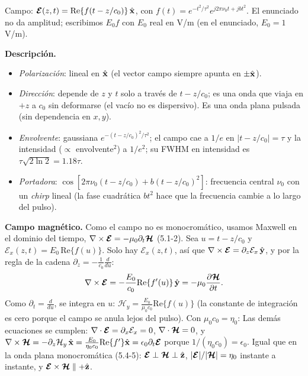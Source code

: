 Campo: $\boldsymbol{\mathcal E}(z,t)=\mathrm{Re}\{f(t-z/c_0)\}\,\hat{\mathbf x}$, con $f(t)=e^{-t^2/\tau^2}e^{j2\pi\nu_0t+jbt^2}$. El enunciado no da
amplitud; escribimos $E_0f$ con $E_0$ real en V/m (en el enunciado, $E_0=1$ V/m).

 \textbf{Descripción.}
\begin{itemize}
\item \emph{Polarización}: lineal en $\hat{\mathbf x}$ (el vector campo siempre apunta en $\pm\hat{\mathbf x}$).
\item \emph{Dirección}: depende de $z$ y $t$ solo a través de $t-z/c_0$; es una onda que viaja en $+z$ a $c_0$ sin
deformarse (el vacío no es dispersivo). Es una onda plana pulsada (sin dependencia en $x,y$).
\item \emph{Envolvente}: gaussiana $e^{-(t-z/c_0)^2/\tau^2}$; el campo cae a $1/e$ en $|t-z/c_0|=\tau$ y la intensidad
($\propto$ envolvente$^2$) a $1/e^2$; su FWHM en intensidad es $\tau\sqrt{2\ln2}=1.18\tau$.
\item \emph{Portadora}: $\cos[2\pi\nu_0(t-z/c_0)+b(t-z/c_0)^2]$: frecuencia central $\nu_0$ con un \emph{chirp} lineal
(la fase cuadrática $bt^2$ hace que la frecuencia cambie a lo largo del pulso).
\end{itemize}

 \textbf{Campo magnético.} Como el campo no es monocromático, usamos Maxwell en el dominio del tiempo,
$\nabla\times\boldsymbol{\mathcal E}=-\mu_0\partial_t\boldsymbol{\mathcal H}$ (5.1-2). Sea $u=t-z/c_0$ y $\mathcal E_x(z,t)=E_0\,\mathrm{Re}\{f(u)\}$. Solo hay
$\mathcal E_x(z,t)$, así que $\nabla\times\boldsymbol{\mathcal E}=\partial_z\mathcal E_x\,\hat{\mathbf y}$, y por la regla de la cadena
$\partial_z=-\frac1{c_0}\frac{d}{du}$:
\begin{equation*}
\nabla\times\boldsymbol{\mathcal E}=-\frac{E_0}{c_0}\mathrm{Re}\{f'(u)\}\,\hat{\mathbf y}=-\mu_0\frac{\partial\boldsymbol{\mathcal H}}{\partial t}.
\end{equation*}
Como $\partial_t=\frac{d}{du}$, se integra en $u$: $\mathcal H_y=\frac{E_0}{\mu_0c_0}\mathrm{Re}\{f(u)\}$ (la constante de
integración es cero porque el campo se anula lejos del pulso). Con $\mu_0c_0=\eta_0$:
Las demás ecuaciones se cumplen: $\nabla\cdot\boldsymbol{\mathcal E}=\partial_x\mathcal E_x=0$, $\nabla\cdot\boldsymbol{\mathcal H}=0$, y
$\nabla\times\boldsymbol{\mathcal H}=-\partial_z\mathcal H_y\,\hat{\mathbf x}=\frac{E_0}{\eta_0c_0}\mathrm{Re}\{f'\}\hat{\mathbf x}=\epsilon_0\partial_t\boldsymbol{\mathcal E}$ porque
$1/(\eta_0c_0)=\epsilon_0$. Igual que en la onda plana monocromática (5.4-5): $\boldsymbol{\mathcal E}\perp\boldsymbol{\mathcal H}\perp\hat{\mathbf z}$,
$|\boldsymbol{\mathcal E}|/|\boldsymbol{\mathcal H}|=\eta_0$ instante a instante, y $\boldsymbol{\mathcal E}\times\boldsymbol{\mathcal H}\parallel+\hat{\mathbf z}$.

